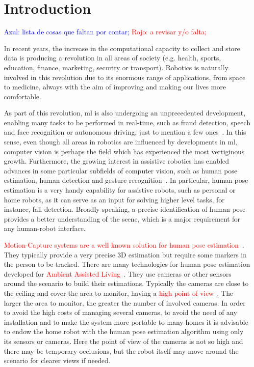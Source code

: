 \chapter{Introduction}\label{ch:introduction}

\textcolor{blue}{Azul: lista de cosas que faltan por contar;} \textcolor{red}{Rojo: a revisar y/o falta;}

In recent years, the increase in the computational capacity to collect and store data is producing a revolution in all areas of society (e.g. health, sports, education, finance, marketing, security or transport). Robotics is naturally involved in this revolution due to its enormous range of applications, from space to medicine, always with the aim of improving and making our lives more comfortable. %

As part of this revolution, \gls{ml} is also undergoing an unprecedented development, enabling many tasks to be performed in real-time, such as fraud detection, speech and face recognition or autonomous driving, just to mention a few ones~\cite{liu2017survey}. In this sense, even though all areas in robotics are influenced by developments in \gls{ml}, computer vision is perhaps the field which has experienced the most vertiginous growth. Furthermore, the growing interest in assistive robotics has enabled advances in some particular subfields of computer vision, such as human pose estimation, human detection and gesture recognition~\cite{leo2018deep}. In particular, human pose estimation is a very handy capability for assistive robots, such as personal or home robots, as it can serve as an input for solving higher level tasks, for instance, fall detection. Broadly speaking, a precise identification of human pose provides a better understanding of the scene, which is a major requirement for any human-robot interface.

\textcolor{red}{Motion-Capture systems are a well known solution for human pose estimation~\cite{Vicon}}. They typically provide a very precise 3D estimation but require some markers in the person to be tracked. There are many technologies for human pose estimation developed for \textcolor{red}{Ambient Assisted Living~\cite{}}. They use cameras or other sensors around the scenario to build their estimations. Typically the cameras are close to the ceiling and cover the area to monitor, having a \textcolor{red}{high point of view~\cite{OpenPose}}. The larger the area to monitor, the greater the number of involved cameras. In order to avoid the high costs of managing several cameras, to avoid the need of any installation and to make the system more portable to many homes it is advisable to endow the home robot with the human pose estimation algorithm using only its sensors or cameras. Here the point of view of the cameras is not so high and there may be temporary occlusions, but the robot itself may move around the scenario for clearer views if needed.

